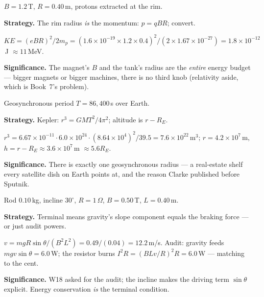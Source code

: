 \begin{example}\label{ex:w39}
$B=1.2$\,T, $R=0.40$\,m, protons extracted at the rim.
\par\smallskip
\textbf{Strategy.} The rim radius \emph{is} the momentum:
$p=qBR$; convert.
\begin{solution}
$KE=(eBR)^{2}/2m_p=(1.6\times10^{-19}\times1.2\times0.4)^{2}
/(2\times1.67\times10^{-27})=1.8\times10^{-12}$\,J
$\approx11$\,MeV.
\checkmark
\end{solution}
\textbf{Significance.} The magnet's $B$ and the tank's radius are the
\emph{entire} energy budget --- bigger magnets or bigger machines,
there is no third knob (relativity aside, which is Book~7's
problem).
\end{example}

\begin{example}\label{ex:w40}
Geosynchronous period $T=86{,}400$\,s over Earth.
\par\smallskip
\textbf{Strategy.} Kepler: $r^{3}=GMT^{2}/4\pi^{2}$; altitude is
$r-R_E$.
\begin{solution}
$r^{3}=6.67\times10^{-11}\cdot6.0\times10^{24}\cdot(8.64\times10^{4})^{2}
/39.5=7.6\times10^{22}$\,m$^{3}$; $r=4.2\times10^{7}$\,m,
$h=r-R_E\approx3.6\times10^{7}$\,m $\approx5.6R_E$.
\checkmark
\end{solution}
\textbf{Significance.} There is exactly one geosynchronous radius ---
a real-estate shelf every satellite dish on Earth points at,
and the reason Clarke published before Sputnik.
\end{example}

\begin{example}\label{ex:w41}
Rod $0.10$\,kg, incline $30^{\circ}$, $R=1\,\Omega$,
$B=0.50$\,T, $L=0.40$\,m.
\par\smallskip
\textbf{Strategy.} Terminal means gravity's slope component equals
the braking force --- or just audit powers.
\begin{solution}
$v=mgR\sin\theta/(B^{2}L^{2})=0.49/(0.04)=12.2$\,m/s.
Audit: gravity feeds $mgv\sin\theta=6.0$\,W; the resistor burns
$I^{2}R=(BLv/R)^{2}R=6.0$\,W --- matching to the cent.
\checkmark
\end{solution}
\textbf{Significance.} W18 asked for the audit; the incline makes the
driving term $\sin\theta$ explicit. Energy conservation \emph{is}
the terminal condition.
\end{example}

